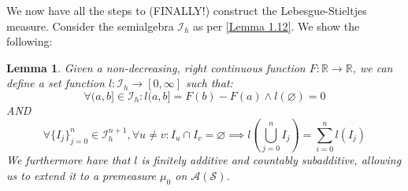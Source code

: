 \documentclass[10pt,letterpaper]{article} %
\newtheorem{lem}{Lemma}[section]
\begin{document}
We now have all the steps to (FINALLY!) construct the Lebesgue-Stieltjes measure. Consider the semialgebra $\mathcal{I}_h$ as per \cref{Lemma 1.12}. We show the following:
\begin{lem}
Given a non-decreasing, right continuous function $F: \mathbb{R} \xrightarrow{} \mathbb{R}$, we can define a set function $l: \mathcal{I}_h \xrightarrow{} [0, \infty]$ such that:
\begin{equation*}
\forall (a, b] \in \mathcal{I}_h: l(a, b] = F(b) - F(a) \land l(\varnothing) = 0
\end{equation*}
AND
\begin{equation*}
\forall \{I_j\}_{j=0}^n \in \mathcal{I}_h^{n+1}, \forall u \neq v: I_u \cap I_v = \varnothing \implies l\left(\bigcup_{j=0}^n I_j\right) = \sum_{i=0}^{n}l(I_j)
\end{equation*}
We furthermore have that $l$ is finitely additive and countably subadditive, allowing us to extend it to a premeasure $\mu_0$ on $\mathcal{A}(\mathcal{S})$.
\end{lem}
\end{document}
